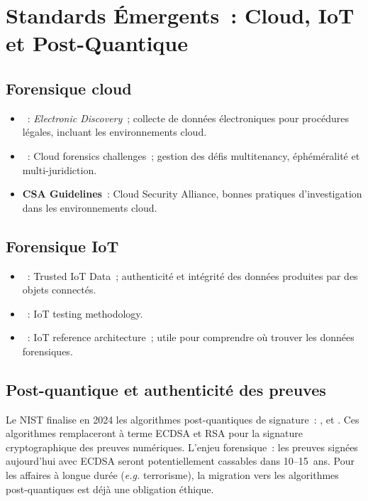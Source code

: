 \section{Standards Émergents~: Cloud, IoT et Post-Quantique}
\label{sec:standards-emergents}

\subsection{Forensique cloud}

\begin{itemize}
    \item {}~: \textit{Electronic Discovery}~;
          collecte de données électroniques pour procédures légales,
          incluant les environnements cloud.
    \item {}~: Cloud forensics challenges~;
          gestion des défis multitenancy, éphéméralité et multi-juridiction.
    \item \textbf{CSA Guidelines}~: Cloud Security Alliance,
          bonnes pratiques d'investigation dans les environnements cloud.
\end{itemize}

\subsection{Forensique IoT}

\begin{itemize}
    \item {}~: Trusted IoT Data~;
          authenticité et intégrité des données produites par des objets connectés.
    \item {}~: IoT testing methodology.
    \item {}~: IoT reference architecture~;
          utile pour comprendre où trouver les données forensiques.
\end{itemize}

\subsection{Post-quantique et authenticité des preuves}

Le NIST finalise en 2024 les algorithmes post-quantiques de signature~:
,  et . Ces
algorithmes remplaceront à terme ECDSA et RSA pour la signature
cryptographique des preuves numériques. L'enjeu forensique~: les preuves
signées aujourd'hui avec ECDSA seront potentiellement cassables dans 10--15~ans.
Pour les affaires à longue durée (\textit{e.g.} terrorisme), la migration
vers les algorithmes post-quantiques est déjà une obligation éthique.

